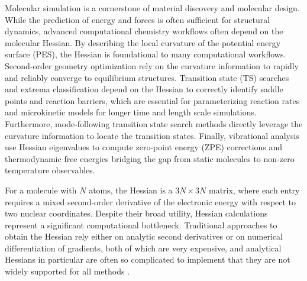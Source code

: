 \documentclass[pdflatex,sn-mathphys-num]{sn-jnl}%
\theoremstyle{thmstyleone}%
\theoremstyle{thmstyletwo}%
\theoremstyle{thmstylethree}%
\begin{document}
Molecular simulation is a cornerstone of material discovery and molecular design. While the prediction of energy and forces is often sufficient for structural dynamics, advanced computational chemistry workflows often depend on the molecular Hessian\citep{qu2016,huang2018}. By describing the local curvature of the potential energy surface (PES), the Hessian is foundational to many computational workflows. Second-order geometry optimization rely on the curvature information to rapidly and reliably converge to equilibrium structures\cite{schlegel2011}. Transition state (TS) searches and extrema classification depend on the Hessian to correctly identify saddle points and reaction barriers, which are essential for parameterizing reaction rates and microkinetic models for longer time and length scale simulations\cite{andersen2019}. Furthermore, mode-following transition state search methods directly leverage the curvature information to locate the transition states\cite{henkelman1999}. Finally, vibrational analysis use Hessian eigenvalues to compute zero-point energy (ZPE) corrections and thermodynamic free energies bridging the gap from static molecules to non-zero temperature observables\cite{grimme2012}. 


For a molecule with $N$ atoms, the Hessian is a $3N \times 3N$ matrix, where each entry requires a mixed second-order derivative of the electronic energy with respect to two nuclear coordinates. Despite their broad utility, Hessian calculations represent a significant computational bottleneck.
Traditional approaches to obtain the Hessian rely either on analytic second derivatives or on numerical differentiation of gradients, both of which are very expensive, and analytical Hessians in particular are often so complicated to implement that they are not widely supported for all methods \citep{jorgensen1983,handy1984,komornicki1993}.
\end{document}
